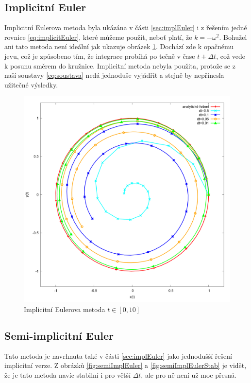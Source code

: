 \subsection{Implicitní Euler}
Implicitní Eulerova metoda byla ukázána v části \ref{sec:implEuler} i z řešením jedné rovnice \eqref{eq:implicitEuler}, které můžeme použít, neboť platí, že $ k=-\omega^2 $. 
Bohužel ani tato metoda není ideální jak ukazuje obrázek \ref{fig:implicitEuler}. Dochází zde k opačnému jevu, což je způsobeno tím, že integrace probíhá po tečně v čase $ t+\Delta t $, což vede k posunu směrem do kružnice. Implicitní metoda nebyla použita, protože se z naší soustavy \eqref{eq:soustava} nedá jednoduše vyjádřit a stejně by nepřinesla užitečné výsledky.
\begin{figure}
	\caption{Implicitní Eulerova metoda $ t\in [0,10] $}
	\label{fig:implicitEuler} 
	\centering
	\includegraphics[width=\linewidth]{Figs/implicitEuler}
\end{figure}
\subsection{Semi-implicitní Euler}
Tato metoda je navrhnuta také v části \ref{sec:implEuler} jako jednodušší řešení implicitní verze. Z obrázků \ref{fig:semiImplEuler} a \ref{fig:semiImplEulerStab} je vidět, že je tato metoda navíc stabilní i pro větší $ \Delta t $, ale pro ně není už moc přesná.

